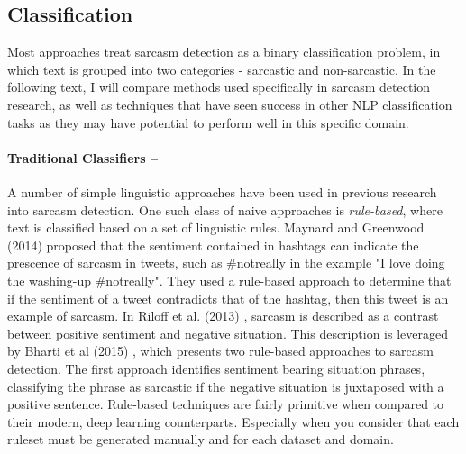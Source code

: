 \documentclass[12pt,a4paper]{article}
\begin{document}
\subsection{Classification}
\noindent Most approaches treat sarcasm detection as a binary classification problem, in which text is grouped into two categories - sarcastic and non-sarcastic. In the following text, I will compare methods used specifically in sarcasm detection research, as well as techniques that have seen success in other NLP classification tasks as they may have potential to perform well in this specific domain.

\paragraph{Traditional Classifiers --}
A number of simple linguistic approaches have been used in previous research into sarcasm detection. One such class of naive approaches is \textit{rule-based}, where text is classified based on a set of linguistic rules. Maynard and Greenwood (2014) \cite{maynard2014cares} proposed that the sentiment contained in hashtags can indicate the prescence of sarcasm in tweets, such as \#notreally in the example "I love doing the washing-up \#notreally". They used a rule-based approach to determine that if the sentiment of a tweet contradicts that of the hashtag, then this tweet is an example of sarcasm. In Riloff et al. (2013) \cite{riloff2013sarcasm}, sarcasm is described as a contrast between positive sentiment and negative situation. This description is leveraged by Bharti et al (2015) \cite{bharti2015parsing}, which presents two rule-based approaches to sarcasm detection. The first approach identifies sentiment bearing situation phrases, classifying the phrase as sarcastic if the negative situation is juxtaposed with a positive sentence. Rule-based techniques are fairly primitive when compared to their modern, deep learning counterparts. Especially when you consider that each ruleset must be generated manually and for each dataset and domain.
\end{document}
